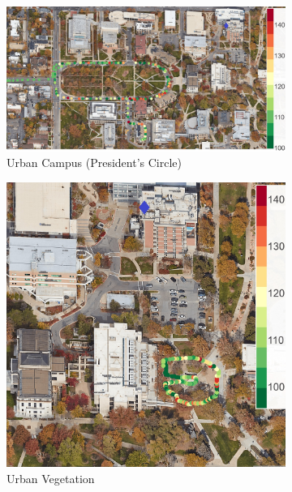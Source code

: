 \documentclass[12pt, draftcls, onecolumn]{IEEEtran}
\begin{document}
\begin{figure} [t]
     \centering
     \begin{subfigure}{0.48\linewidth}
         \centering
         \includegraphics[width=1.0\linewidth]{figs/pl_urban_campus.jpg}
         \caption{Urban Campus (President's Circle)}
         \label{F6a}
     \end{subfigure}
     \begin{subfigure}{0.245\linewidth}
         \centering
         \includegraphics[width=1.0\linewidth]{figs/pl_urban_vegetation.jpg}
         \caption{Urban Vegetation}
         \label{F6b}
     \end{subfigure}
     \begin{subfigure}{0.245\linewidth}

\end{subfigure}
\end{figure}
\end{document}
